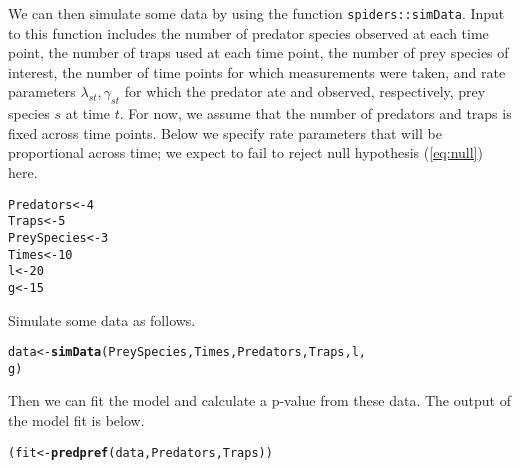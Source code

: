 \documentclass[12pt]{article}\usepackage[]{graphicx}\usepackage[]{color}
\makeatletter
\newcommand{\hlnum}[1]{\textcolor[rgb]{0.686,0.059,0.569}{#1}}%
\newcommand{\hlstd}[1]{\textcolor[rgb]{0.345,0.345,0.345}{#1}}%
\newcommand{\hlkwb}[1]{\textcolor[rgb]{0.69,0.353,0.396}{#1}}%
\newcommand{\hlkwd}[1]{\textcolor[rgb]{0.737,0.353,0.396}{\textbf{#1}}}%
\newenvironment{kframe}{%
 \def\at@end@of@kframe{}%
 \ifinner\ifhmode%
  \def\at@end@of@kframe{\end{minipage}}%
  \begin{minipage}{\columnwidth}%
 \fi\fi%
 \def\FrameCommand##1{\hskip\@totalleftmargin \hskip-\fboxsep
 \colorbox{shadecolor}{##1}\hskip-\fboxsep
     \hskip-\linewidth \hskip-\@totalleftmargin \hskip\columnwidth}%
 \MakeFramed {\advance\hsize-\width
   \@totalleftmargin\z@ \linewidth\hsize
   \@setminipage}}%
 {\par\unskip\endMakeFramed%
 \at@end@of@kframe}
\newenvironment{knitrout}{}{} %
\makeatother
\begin{document}
We can then simulate some data by using the function \texttt{spiders::simData}.  Input to this function includes the number of predator species observed at each time point, the number of traps used at each time point, the number of prey species of interest, the number of time points for which measurements were taken, and rate parameters $\lambda_{st}, \gamma_{st}$ for which the predator ate and observed, respectively, prey species $s$ at time $t$.  For now, we assume that the number of predators and traps is fixed across time points.  Below we specify rate parameters that will be proportional across time; we expect to fail to reject null hypothesis (\ref{eq:null}) here. 

\begin{knitrout}
\color{fgcolor}\begin{kframe}
\begin{alltt}
\hlstd{Predators} \hlkwb{<-} \hlnum{4}
\hlstd{Traps} \hlkwb{<-} \hlnum{5}
\hlstd{PreySpecies} \hlkwb{<-} \hlnum{3}
\hlstd{Times} \hlkwb{<-} \hlnum{10}
\hlstd{l} \hlkwb{<-} \hlnum{20}
\hlstd{g} \hlkwb{<-} \hlnum{15}
\end{alltt}
\end{kframe}
\end{knitrout}


Simulate some data as follows.

\begin{knitrout}
\color{fgcolor}\begin{kframe}
\begin{alltt}
\hlstd{data} \hlkwb{<-} \hlkwd{simData}\hlstd{(PreySpecies, Times, Predators, Traps, l,}
    \hlstd{g)}
\end{alltt}


{\ttfamily\noindent\bfseries{}}\end{kframe}
\end{knitrout}


Then we can fit the model and calculate a p-value from these data.  The output of the model fit is below.

\begin{knitrout}
\color{fgcolor}\begin{kframe}
\begin{alltt}
\hlstd{(fit} \hlkwb{<-} \hlkwd{predpref}\hlstd{(data, Predators, Traps))}
\end{alltt}


{\ttfamily\noindent\bfseries\color{errorcolor}{Error: object of type 'closure' is not subsettable}}\end{kframe}
\end{knitrout}
\end{document}
